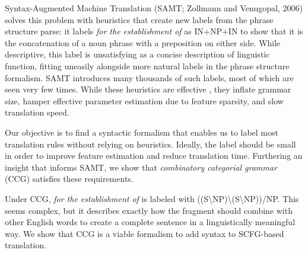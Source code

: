 \documentclass[a4paper]{article}
\begin{document}
Syntax-Augmented Machine Translation 
(SAMT; Zollmann and Venugopal, 2006) \nocite{samt-wmt06} %
solves this problem with heuristics that create new labels from the phrase structure parse: it labels {\em for the establishment of} as IN+NP+IN to show that it is the concatenation of a noun phrase with a preposition on either side. While descriptive, this label is unsatisfying as a concise description of linguistic function, fitting uneasily alongside more natural labels in the phrase structure formalism. SAMT introduces many thousands of such labels, most of which are seen very few times. While these heuristics are effective \cite{zollmann+etal:2008:coling}, they inflate grammar size, hamper effective parameter estimation due to feature sparsity, and slow translation speed.

Our objective is to find a syntactic formalism that enables us to label most translation rules without relying on heuristics. Ideally, the label should be small in order to improve feature estimation and reduce translation time. Furthering an insight that informs SAMT, we show that {\em combinatory categorial grammar} (CCG) satisfies these requirements.

Under CCG, {\em for the establishment of} is labeled with ((S\textbackslash NP)\textbackslash (S\textbackslash NP))/NP. This seems complex, but it describes exactly how the fragment should combine with other English words to create a complete sentence in a linguistically meaningful way. We show that CCG is a viable  formalism to add syntax to SCFG-based translation.

%

\end{document}
